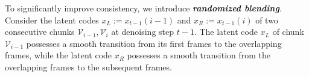 %
%
To significantly improve consistency, we introduce \textbf{\textit{randomized blending}}.
Consider the latent codes $x_{L} := x_{t-1}(i-1)$ and  $x_{R} := x_{t-1}(i)$ of two consecutive chunks $\mathcal{V}_{i-1},\mathcal{V}_{i}$ at denoising step $t-1$. The latent code $x_{L}$ of chunk $\mathcal{V}_{i-1}$ possesses a smooth transition from its first frames to the overlapping frames, while the latent code $x_{R}$  possesses a smooth transition from the overlapping frames to the subsequent frames. 
